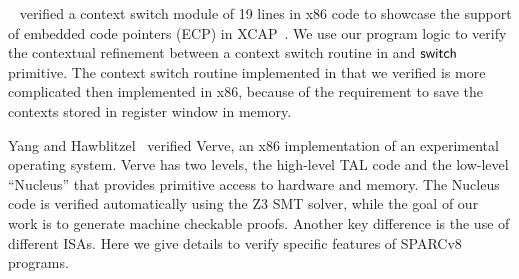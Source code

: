 
~\cite{ctxm} verified a context switch module of 19 lines
in x86 code to showcase the support of embedded
code pointers (ECP) in XCAP~\cite{xcap}.
We use our program logic to verify the contextual
refinement between a context switch routine in \sparc{}
and $\mathsf{switch}{}$ primitive. The context switch routine
implemented in \sparc{} that we verified
is more complicated then
implemented in x86, because of the requirement to save
the contexts stored in register window in memory.

Yang and Hawblitzel~\cite{YangPLDI10} verified Verve, an x86
implementation of an experimental operating system. Verve has two
levels, the high-level TAL code and the low-level ``Nucleus''
that provides primitive access to hardware and memory.
The Nucleus code is verified automatically using the Z3 SMT solver,
while the goal of our work is to generate machine checkable proofs.
Another key difference is the use of different ISAs. Here
we give details to verify specific features of SPARCv8 programs.

